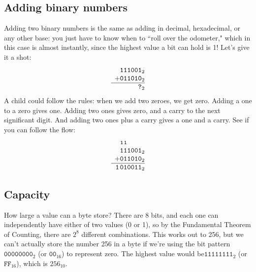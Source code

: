 \subsection{Adding binary numbers}

Adding two binary numbers is the same as adding in decimal, hexadecimal, or
any other base: you just have to know when to ``roll over the odometer,"
which in this case is almost instantly, since the highest value a bit can
hold is 1! Let's give it a shot:
\[
\begin{array}{*{7}{c@{\hspace{0pt}}}}
   & \texttt{1} & \texttt{1} & \texttt{1} & \texttt{0} & \texttt{0} & \texttt{1}_2 \\
 + & \texttt{0} & \texttt{1} & \texttt{1} & \texttt{0} & \texttt{1} & \texttt{0}_2 \\
\hline
   & \texttt{ } & \texttt{ } & \texttt{ } & \texttt{ } & \texttt{ } & \texttt{?}_2 \\
\end{array}
\]
A child could follow the rules: when we add two zeroes, we get zero. Adding
a one to a zero gives one. Adding two ones gives zero, and a carry to the
next significant digit. And adding two ones plus a carry gives a one and a
carry. See if you can follow the flow:
\[
\begin{array}{*{7}{c@{\hspace{0pt}}}}
   & \texttt{{\footnotesize 1}}  & \texttt{{\footnotesize 1}}         & & \\
   & \texttt{1} & \texttt{1} & \texttt{1} & \texttt{0} & \texttt{0} & \texttt{1}_2 \\
 + & \texttt{0} & \texttt{1} & \texttt{1} & \texttt{0} & \texttt{1} & \texttt{0}_2 \\
\hline
 \texttt{1} & \texttt{0} & \texttt{1} & \texttt{0} & \texttt{0} & \texttt{1} & \texttt{1}_2 \\
\end{array}
\]

\subsection{Capacity}

How large a value can a byte store? There are 8 bits, and each one can
independently have either of two values (0 or 1), so by the Fundamental
Theorem of Counting, there are $2^8$ different combinations. This works out
to 256, but we can't actually store the number 256 in a byte if we're using
the bit pattern $\texttt{00000000}_2$ (or $\texttt{00}_{16}$) to represent
zero. The highest value would be$\texttt{11111111}_2$ (or
$\texttt{FF}_{16}$), which is $256_{10}$.

